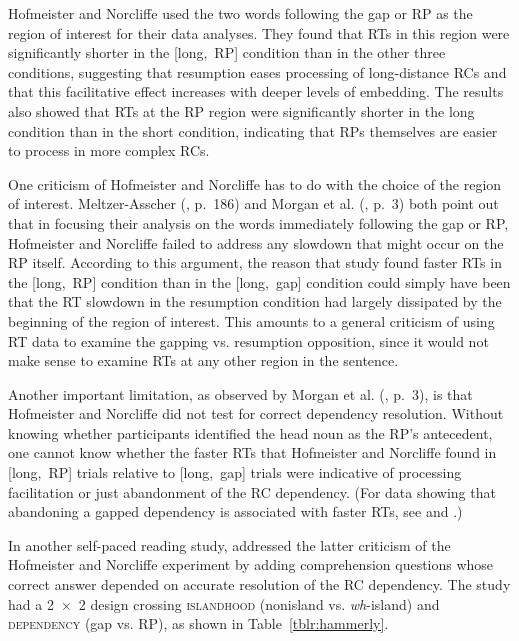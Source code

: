 Hofmeister and Norcliffe used the two words following the gap or RP as the region of interest for their data analyses. They found that RTs in this region were significantly shorter in the [long,~RP] condition than in the other three conditions, suggesting that resumption eases processing of long-distance RCs and that this facilitative effect increases with deeper levels of embedding. The results also showed that RTs at the RP region were significantly shorter in the long condition than in the short condition, indicating that RPs themselves are easier to process in more complex RCs.

One criticism of Hofmeister and Norcliffe has to do with the choice of the region of interest. Meltzer-Asscher (\citeyear{meltzer-asscher2021}, p.~186) and Morgan et al. (\citeyear{morgan.etal2020}, p.~3) both point out that in focusing their analysis on the words immediately following the gap or RP, Hofmeister and Norcliffe failed to address any slowdown that might occur on the RP itself. According to this argument, the reason that study found faster RTs in the [long,~RP] condition than in the [long,~gap] condition could simply have been that the RT slowdown in the resumption condition had largely dissipated by the beginning of the region of interest. This amounts to a general criticism of using RT data to examine the gapping vs. resumption opposition, since it would not make sense to examine RTs at any other region in the sentence.

Another important limitation, as observed by Morgan et al. (\citeyear{morgan.etal2020}, p.~3), is that Hofmeister and Norcliffe did not test for correct dependency resolution. Without knowing whether participants identified the head noun as the RP's antecedent, one cannot know whether the faster RTs that Hofmeister and Norcliffe found in [long,~RP] trials relative to [long,~gap] trials were indicative of processing facilitation or just abandonment of the RC dependency. (For data showing that abandoning a gapped dependency is associated with faster RTs, see \cite{nicenboim.etal2016} and \cite{omaki.schulz2011}.)

In another self-paced reading study, \textcite{hammerly2022} addressed the latter criticism of the Hofmeister and Norcliffe experiment by adding comprehension questions whose correct answer depended on accurate resolution of the RC dependency. The study had a 2~×~2 design crossing \textsc{islandhood} (nonisland vs. \textit{wh}-island) and \textsc{dependency} (gap vs. RP), as shown in Table~\ref{tblr:hammerly}.

